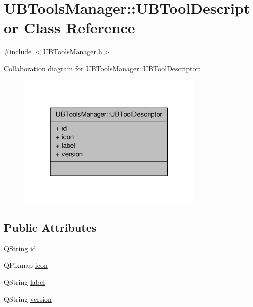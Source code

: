 \hypertarget{class_u_b_tools_manager_1_1_u_b_tool_descriptor}{\section{U\-B\-Tools\-Manager\-:\-:U\-B\-Tool\-Descriptor Class Reference}
\label{d9/d66/class_u_b_tools_manager_1_1_u_b_tool_descriptor}
}


{\ttfamily \#include $<$U\-B\-Tools\-Manager.\-h$>$}



Collaboration diagram for U\-B\-Tools\-Manager\-:\-:U\-B\-Tool\-Descriptor\-:
\nopagebreak
\begin{figure}[H]
\begin{center}
\leavevmode
\includegraphics[width=256pt]{d1/d04/class_u_b_tools_manager_1_1_u_b_tool_descriptor__coll__graph}
\end{center}
\end{figure}
\subsection*{Public Attributes}
\begin{DoxyCompactItemize}
\item 
Q\-String \hyperlink{class_u_b_tools_manager_1_1_u_b_tool_descriptor_ab638247040d512615c8bded4d5559fea}{id}
\item 
Q\-Pixmap \hyperlink{class_u_b_tools_manager_1_1_u_b_tool_descriptor_a2c59dca8e19715a1e987111c27a7548c}{icon}
\item 
Q\-String \hyperlink{class_u_b_tools_manager_1_1_u_b_tool_descriptor_adefbcf24efe89a56bfc62808d18255a1}{label}
\item 
Q\-String \hyperlink{class_u_b_tools_manager_1_1_u_b_tool_descriptor_afc91af931f9d49b7386c579ec758121f}{version}
\end{DoxyCompactItemize}


